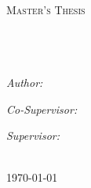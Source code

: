 \begin{fullwidth}
	

\begin{titlepage}
	\vspace*{\fill}
	\begin{center}
		\textsc{\LARGE \univname}\\[1.5cm] %
		\textsc{\Large Master's Thesis}\\[0.5cm] %
		\HRule \\[0.4cm]
		{ \huge \bfseries \ttitle}\\[0.4cm] %
		\HRule \\[1.5cm]
		\begin{minipage}{0.4\textwidth}
			\begin{flushleft} \small
				\emph{Author:}\\\textsc{\authornames} %
			\end{flushleft}
		\end{minipage}
  	\begin{minipage}{0.4\textwidth}
			\begin{center} \small
				\emph{Co-Supervisor:}\\\textsc{\cosupname} %
			\end{center}
		\end{minipage}
		\begin{minipage}{0.4\textwidth}
			\begin{flushright} \small
				\emph{Supervisor:} \\ \textsc{\supname} %
			\end{flushright}
		\end{minipage}\\[4cm]
		{\large \today}\\[3cm] %
	\end{center}
\end{titlepage}


\end{fullwidth}
